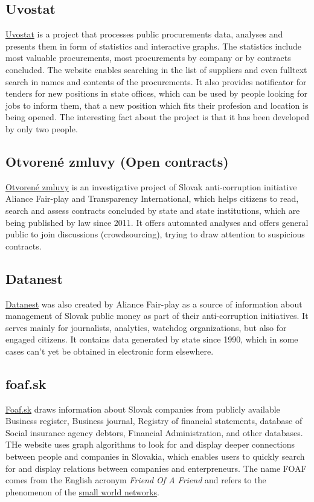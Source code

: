 \documentclass[thesis=B,english]{FITthesis}[2012/06/26]
\begin{document}
	\subsection{Uvostat}
	\href{https://www.uvostat.sk/about}{Uvostat} is a project that processes public procurements data, analyses and presents them in form of statistics and interactive graphs. The statistics include most valuable procurements, most procurements by company or by contracts concluded. The website enables searching in the list of suppliers and even fulltext search in names and contents of the procurements. It also provides notificator for tenders for new positions in state offices, which can be used by people looking for jobs to inform them, that a new position which fits their profesion and location is being opened. The interesting fact about the project is that it has been developed by only two people.
	\subsection{Otvorené zmluvy (Open contracts)}
	\href{http://www.otvorenezmluvy.sk/o-projekte}{Otvorené zmluvy} is an investigative project of Slovak anti-corruption initiative Aliance Fair-play and Transparency International, which helps citizens to read, search and assess contracts concluded by state and state institutions, which are being published by law since 2011. It offers automated analyses and offers general public to join discussions (crowdsourcing), trying to draw attention to suspicious contracts.	
	\subsection{Datanest}
	\href{http://datanest.fair-play.sk/}{Datanest} was also created by Aliance Fair-play as a source of information about management of Slovak public money as part of their anti-corruption initiatives. It serves mainly for journalists, analytics, watchdog organizations, but also for engaged citizens. It contains data generated by state since 1990, which in some cases can't yet be obtained in electronic form elsewhere.
	\subsection{foaf.sk}
	\href{http://foaf.sk}{Foaf.sk} draws information about Slovak companies from publicly available Business register, Business journal, Registry of financial statements, database of Social insurance agency debtors, Financial Administration, and other databases. THe website uses graph algorithms to look for and display deeper connections between people and companies in Slovakia, which enables users to quickly search for and display relations between companies and enterpreneurs. The name FOAF comes from the English acronym \textit{Friend Of A Friend} and refers to the phenomenon of the \href{https://en.wikipedia.org/wiki/Small-world_experiment}{small world networks}.
	
\end{document}

